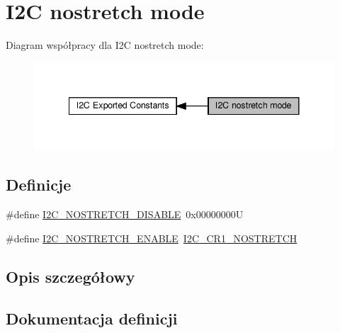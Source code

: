 \hypertarget{group___i2_c__nostretch__mode}{}\section{I2C nostretch mode}
\label{group___i2_c__nostretch__mode}
Diagram współpracy dla I2C nostretch mode\+:\nopagebreak
\begin{figure}[H]
\begin{center}
\leavevmode
\includegraphics[width=341pt]{group___i2_c__nostretch__mode}
\end{center}
\end{figure}
\subsection*{Definicje}
\begin{DoxyCompactItemize}
\item 
\#define \hyperlink{group___i2_c__nostretch__mode_ga611deefe89e56fa65f853e6796f2cf66}{I2\+C\+\_\+\+N\+O\+S\+T\+R\+E\+T\+C\+H\+\_\+\+D\+I\+S\+A\+B\+LE}~0x00000000U
\item 
\#define \hyperlink{group___i2_c__nostretch__mode_ga67ebace1182d99bb5d7968994c01c80e}{I2\+C\+\_\+\+N\+O\+S\+T\+R\+E\+T\+C\+H\+\_\+\+E\+N\+A\+B\+LE}~\hyperlink{group___peripheral___registers___bits___definition_ga197aaca79f64e832af3a0a0864c2a08c}{I2\+C\+\_\+\+C\+R1\+\_\+\+N\+O\+S\+T\+R\+E\+T\+CH}
\end{DoxyCompactItemize}


\subsection{Opis szczegółowy}


\subsection{Dokumentacja definicji}
\mbox{\label{group___i2_c__nostretch__mode_ga611deefe89e56fa65f853e6796f2cf66}} 
